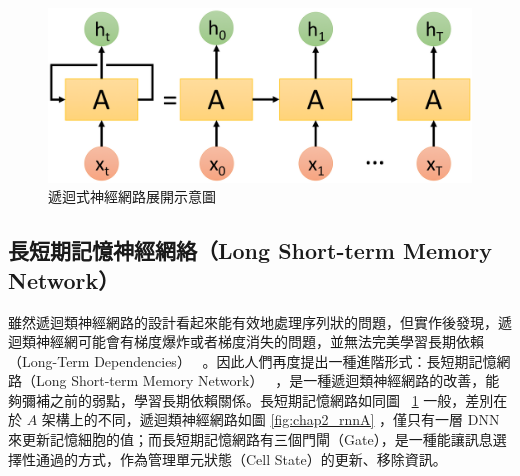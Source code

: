 \begin{figure}[h]
    \centering
    \includegraphics[scale=0.3]{images/chap2_unrollrnn.png}
    \caption{遞迴式神經網路展開示意圖\cite{shen2016} }\label{fig:chap2_unrollrnn}
\end{figure}

\subsection{長短期記憶神經網絡（Long Short-term Memory Network）}
雖然遞迴類神經網路的設計看起來能有效地處理序列狀的問題，但實作後發現，遞迴類神經網可能會有梯度爆炸或者梯度消失的問題，並無法完美學習長期依賴（Long-Term Dependencies）~\cite{bengio1994learning} 。因此人們再度提出一種進階形式：長短期記憶網路（Long Short-term Memory Network）~\cite{hochreiter1997long} ，是一種遞迴類神經網路的改善，能夠彌補之前的弱點，學習長期依賴關係。長短期記憶網路如同圖 ~\ref{fig:chap2_unrollrnn} 一般，差別在於 $A$ 架構上的不同，遞迴類神經網路如圖 \ref{fig:chap2_rnnA} ，僅只有一層 DNN 來更新記憶細胞的值；而長短期記憶網路有三個門閘（Gate），是一種能讓訊息選擇性通過的方式，作為管理單元狀態（Cell State）的更新、移除資訊。


